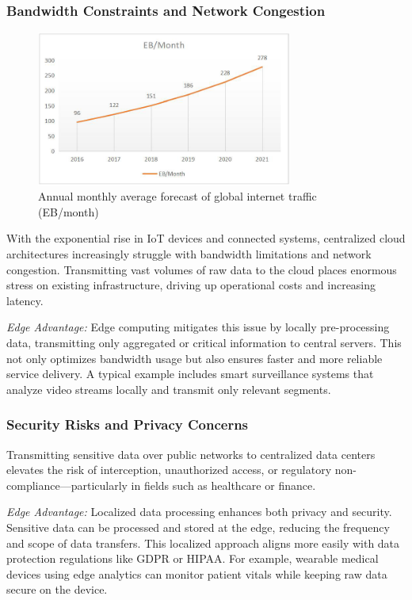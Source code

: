 \documentclass[runningheads]{llncs}
\begin{document}
\subsubsection{Bandwidth Constraints and Network Congestion}

\begin{figure}[h!]
    \centering
    \includegraphics[width=0.75\textwidth]{IMG/8.png}
    \caption{Annual monthly average forecast of global internet traffic (EB/month)}
    \label{fig:internet_traffic}
\end{figure}
\FloatBarrier

With the exponential rise in IoT devices and connected systems, centralized cloud architectures increasingly struggle with bandwidth limitations and network congestion. Transmitting vast volumes of raw data to the cloud places enormous stress on existing infrastructure, driving up operational costs and increasing latency.

\noindent\textit{Edge Advantage:} Edge computing mitigates this issue by locally pre-processing data, transmitting only aggregated or critical information to central servers. This not only optimizes bandwidth usage but also ensures faster and more reliable service delivery. A typical example includes smart surveillance systems that analyze video streams locally and transmit only relevant segments.

\subsubsection{Security Risks and Privacy Concerns}
Transmitting sensitive data over public networks to centralized data centers elevates the risk of interception, unauthorized access, or regulatory non-compliance—particularly in fields such as healthcare or finance.

\noindent\textit{Edge Advantage:} Localized data processing enhances both privacy and security. Sensitive data can be processed and stored at the edge, reducing the frequency and scope of data transfers. This localized approach aligns more easily with data protection regulations like GDPR or HIPAA. For example, wearable medical devices using edge analytics can monitor patient vitals while keeping raw data secure on the device.
\end{document}
